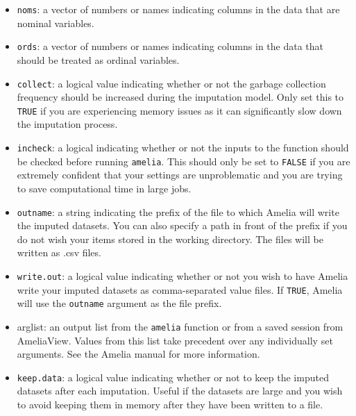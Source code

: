 \documentclass[12pt,titlepage]{article}
\begin{document}
\begin{itemize}
      \item \texttt{noms}: a vector of numbers or names indicating
        columns in the data that are nominal variables.
        
      \item \texttt{ords}: a vector of numbers or names indicating
        columns in the data that should be treated as ordinal variables.
        
      \item \texttt{collect}: a logical value indicating whether or
        not the garbage collection frequency should be increased during the imputation model.  Only set this to \texttt{TRUE} if you are experiencing memory
        issues as it can significantly slow down the imputation
        process.
        
      \item \texttt{incheck}: a logical indicating whether or not the
        inputs to the function should be checked before running
        \texttt{amelia}.  This should only be set to \texttt{FALSE} if you
        are extremely confident that your settings are unproblematic
        and you are trying to save computational time in large jobs.
        
      \item \texttt{outname}: a string indicating the prefix of the
        file to which Amelia will write the imputed datasets.  You can
        also specify a path in front of the prefix if you do not wish
        your items stored in the working directory.  The files will be
        written as .csv files.
        
      \item \texttt{write.out}: a logical value indicating whether or
        not you wish to have Amelia write your imputed datasets as
        comma-separated value files.  If \texttt{TRUE}, Amelia will use
        the \texttt{outname} argument as the file prefix.
        
      \item{arglist}: an output list from the \texttt{amelia} function
        or from a saved session from AmeliaView.  Values from this
        list take precedent over any individually set arguments.  See
        the Amelia manual for more information.
        
      \item \texttt{keep.data}: a logical value indicating whether or
        not to keep the imputed datasets after each imputation.
        Useful if the datasets are large and you wish to avoid keeping
        them in memory after they have been written to a file.

    \end{itemize}
\end{document}
